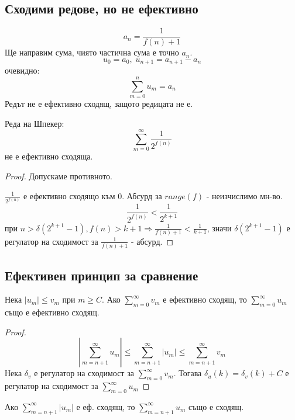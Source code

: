 \subsection{Сходими редове, но не ефективно}
\begin{example}
    \begin{equation*}
        a_n = \frac{1}{f(n) + 1}
    \end{equation*}
    Ще направим сума, чиято частична сума е точно $a_n$.
    \begin{equation}
        u_0 = a_0,\; u_{n+1} = a_{n+1} - a_n
    \end{equation}
    очевидно: 
    \begin{equation*}
        \sum\limits_{m=0}^{n} u_m = a_n
    \end{equation*}
    Редът не е ефективно сходящ, защото редицата не е.
\end{example}
\begin{example}
    Реда на Шпекер:
    \begin{equation*}
        \sum_{m=0}^\infty \frac{1}{2^{f(n)}}
    \end{equation*}
    не е ефективно сходяща.
\end{example}
\begin{proof}
    Допускаме противното. 
    
    $\frac{1}{2^{f(n)}}$ е ефективно сходящо към 0. Абсурд за $range(f)$ - неизчислимо мн-во.
    \begin{equation*}
        \frac{1}{2^{f(n)}} < \frac{1}{2^{k+1}} 
    \end{equation*}
    при $n > \delta(2^{k+1}-1), f(n) > k+1 \Rightarrow \frac{1}{f(n) + 1} < \frac{1}{k+1}$, значи $\delta(2^{k+1}-1)$ е регулатор на сходимост за $\frac{1}{f(n) + 1}$ - абсурд.
\end{proof}

\subsection{Ефективен принцип за сравнение}
\begin{proposition}
    Нека $|u_m| \leq v_m$ при $m \geq C$. Ако $\sum\limits_{m=0}^\infty v_m$ е ефективно сходящ, то $\sum\limits_{m=0}^\infty u_m$ също е ефективно сходящ.
\end{proposition}
\begin{proof}
    \begin{equation*}
        \left| \sum\limits_{m=n+1}^\infty u_m \right| \leq \sum\limits_{m=n+1}^\infty |u_m| \leq \sum\limits_{m=n+1}^\infty v_m
    \end{equation*}
    Нека $\delta_v$ е регулатор на сходимост за $\sum\limits_{m=0}^\infty v_m$. Тогава $\delta_u(k) = \delta_v(k) + C$ е регулатор на сходимост за $\sum\limits_{m=0}^\infty u_m$
\end{proof}
\begin{corollary}
    Ако $\sum\limits_{m=n+1}^\infty |u_m|$ е еф. сходящ, то $\sum\limits_{m=n+1}^\infty u_m$ също е сходящ.
\end{corollary}

